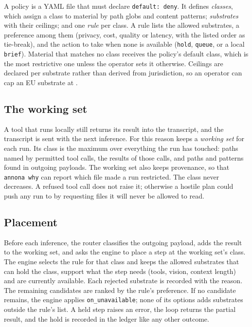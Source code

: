 A policy is a YAML file that must declare \texttt{default: deny}. It defines \emph{classes},
which assign a class to material by path globs and content patterns; \emph{substrates} with
their ceilings; and one \emph{rule} per class. A rule lists the allowed substrates, a
preference among them (privacy, cost, quality or latency, with the listed order as tie-break),
and the action to take when none is available (\texttt{hold}, \texttt{queue}, or a local
\texttt{brief}). Material that matches no class receives the policy's default class, which is
the most restrictive one unless the operator sets it otherwise. Ceilings are declared per
substrate rather than derived from jurisdiction, so an operator can cap an EU substrate at
\pub.

\subsection{The working set}

A tool that runs locally still returns its result into the transcript, and the transcript is
sent with the next inference. For this reason \annona{} keeps a \emph{working set} for each
run. Its class is the maximum over everything the run has touched: paths named by permitted
tool calls, the results of those calls, and paths and patterns found in outgoing payloads. The
working set also keeps provenance, so that \texttt{annona why} can report which file made a run
restricted. The class never decreases. A refused tool call does not raise it; otherwise a
hostile plan could push any run to \res{} by requesting files it will never be allowed to read.

\subsection{Placement}

Before each inference, the router classifies the outgoing payload, adds the result to the
working set, and asks the engine to place a step at the working set's class. The engine selects
the rule for that class and keeps the allowed substrates that can hold the class, support what
the step needs (tools, vision, context length) and are currently available. Each rejected
substrate is recorded with the reason. The remaining candidates are ranked by the rule's
preference. If no candidate remains, the engine applies \texttt{on\_unavailable}; none of its
options adds substrates outside the rule's list. A held step raises an error, the loop returns
the partial result, and the hold is recorded in the ledger like any other outcome.

